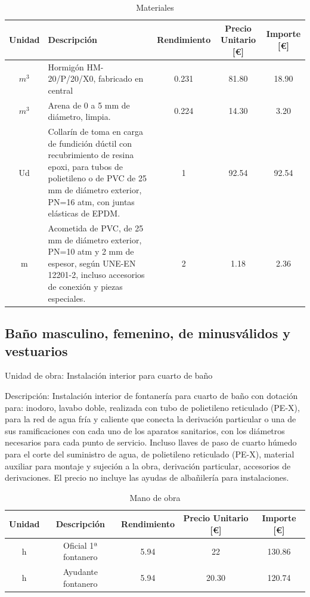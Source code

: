 \documentclass[../main.tex]{subfiles}
\begin{document}
\begin{table}[H]
    \centering
    \begin{tabular}{c|p{5.5cm}|c|c|c}
    Unidad & Descripción & Rendimiento & Precio Unitario [€] & Importe [€] \\ \hline
    $m^3$ & Hormigón HM-20/P/20/X0, fabricado en central& 0.231 & 81.80 & 18.90 \\ 
    $m^3$ & Arena de 0 a 5 mm de diámetro, limpia. & 0.224 & 14.30 & 3.20 \\
    Ud & Collarín de toma en carga de fundición dúctil con recubrimiento de resina epoxi, para tubos de polietileno o de PVC de 25 mm de diámetro exterior,  PN=16 atm, con juntas elásticas de EPDM.& 1 & 92.54 & 92.54 \\
     m&Acometida de PVC, de 25 mm de diámetro exterior, PN=10 atm y 2 mm de espesor, según UNE-EN 12201-2, incluso accesorios de conexión y piezas especiales.& 2 & 1.18 & 2.36 \\ 
    \end{tabular}
    \caption{Materiales}
\end{table}

\subsection{Baño masculino, femenino, de minusválidos y vestuarios}

Unidad de obra: Instalación interior para cuarto de baño

Descripción: Instalación interior de fontanería para cuarto de baño con dotación para: inodoro, lavabo doble, realizada con tubo de polietileno reticulado (PE-X), para la red de agua fría y caliente que conecta la derivación particular o una de sus ramificaciones con cada uno de los aparatos sanitarios, con los diámetros necesarios para cada punto de servicio. Incluso llaves de paso de cuarto húmedo para el corte del suministro de agua, de polietileno reticulado (PE-X), material auxiliar para montaje y sujeción a la obra, derivación particular, accesorios de derivaciones. El precio no incluye las ayudas de albañilería para instalaciones.

\begin{table}[H]
    \centering
    \begin{tabular}{c|c|c|c|c}
    Unidad & Descripción & Rendimiento & Precio Unitario [€] & Importe [€] \\ \hline
    h&Oficial 1ª fontanero & 5.94 & 22 & 130.86 \\
    h&Ayudante fontanero & 5.94 & 20.30 & 120.74 \\
    
    \end{tabular}
    \caption{Mano de obra}
\end{table}
\end{document}
